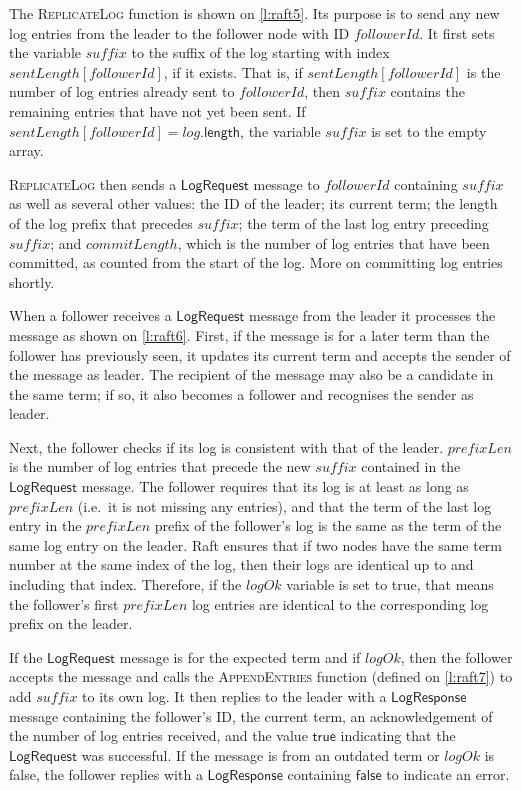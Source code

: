 The \textsc{ReplicateLog} function is shown on \autoref{l:raft5}.
Its purpose is to send any new log entries from the leader to the follower node with ID $\mathit{followerId}$.
It first sets the variable $\mathit{suffix}$ to the suffix of the log starting with index $\mathit{sentLength}[\mathit{followerId}]$, if it exists.
That is, if $\mathit{sentLength}[\mathit{followerId}]$ is the number of log entries already sent to $\mathit{followerId}$, then $\mathit{suffix}$ contains the remaining entries that have not yet been sent.
If $\mathit{sentLength}[\mathit{followerId}] = \mathit{log}.\mathsf{length}$, the variable $\mathit{suffix}$ is set to the empty array.

\textsc{ReplicateLog} then sends a $\mathsf{LogRequest}$ message to $\mathit{followerId}$ containing $\mathit{suffix}$ as well as several other values: the ID of the leader; its current term; the length of the log prefix that precedes $\mathit{suffix}$; the term of the last log entry preceding $\mathit{suffix}$; and $\mathit{commitLength}$, which is the number of log entries that have been committed, as counted from the start of the log.
More on committing log entries shortly.

When a follower receives a $\mathsf{LogRequest}$ message from the leader it processes the message as shown on \autoref{l:raft6}.
First, if the message is for a later term than the follower has previously seen, it updates its current term and accepts the sender of the message as leader.
The recipient of the message may also be a candidate in the same term; if so, it also becomes a follower and recognises the sender as leader.

Next, the follower checks if its log is consistent with that of the leader.
$\mathit{prefixLen}$ is the number of log entries that precede the new $\mathit{suffix}$ contained in the $\mathsf{LogRequest}$ message.
The follower requires that its log is at least as long as $\mathit{prefixLen}$ (i.e.\ it is not missing any entries), and that the term of the last log entry in the $\mathit{prefixLen}$ prefix of the follower's log is the same as the term of the same log entry on the leader.
Raft ensures that if two nodes have the same term number at the same index of the log, then their logs are identical up to and including that index.
Therefore, if the $\mathit{logOk}$ variable is set to true, that means the follower's first $\mathit{prefixLen}$ log entries are identical to the corresponding log prefix on the leader.

If the $\mathsf{LogRequest}$ message is for the expected term and if $\mathit{logOk}$, then the follower accepts the message and calls the \textsc{AppendEntries} function (defined on \autoref{l:raft7}) to add $\mathit{suffix}$ to its own log.
It then replies to the leader with a $\mathsf{LogResponse}$ message containing the follower's ID, the current term, an acknowledgement of the number of log entries received, and the value $\mathsf{true}$ indicating that the $\mathsf{LogRequest}$ was successful.
If the message is from an outdated term or $\mathit{logOk}$ is false, the follower replies with a $\mathsf{LogResponse}$ containing $\mathsf{false}$ to indicate an error.

